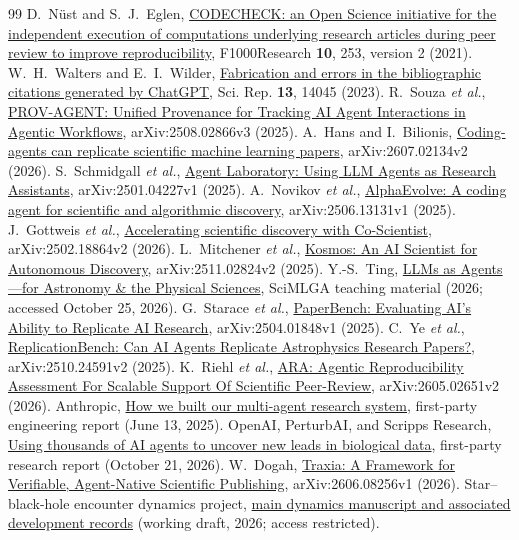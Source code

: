 \documentclass[aps,prd,reprint,nofootinbib]{revtex4-2}
\begin{document}
\begin{thebibliography}{99}
D.~N\"ust and S.~J.~Eglen,
\href{https://doi.org/10.12688/f1000research.51738.2}{CODECHECK: an Open Science initiative for the independent execution of computations underlying research articles during peer review to improve reproducibility}, F1000Research \textbf{10}, 253, version 2 (2021).
W.~H.~Walters and E.~I.~Wilder,
\href{https://doi.org/10.1038/s41598-023-41032-5}{Fabrication and errors in the bibliographic citations generated by ChatGPT}, Sci. Rep. \textbf{13}, 14045 (2023).
R.~Souza \emph{et al.},
\href{https://arxiv.org/abs/2508.02866v3}{PROV-AGENT: Unified Provenance for Tracking AI Agent Interactions in Agentic Workflows}, arXiv:2508.02866v3 (2025).
A.~Hans and I.~Bilionis,
\href{https://arxiv.org/abs/2607.02134v2}{Coding-agents can replicate scientific machine learning papers}, arXiv:2607.02134v2 (2026).
S.~Schmidgall \emph{et al.},
\href{https://arxiv.org/abs/2501.04227v1}{Agent Laboratory: Using LLM Agents as Research Assistants}, arXiv:2501.04227v1 (2025).
A.~Novikov \emph{et al.},
\href{https://arxiv.org/abs/2506.13131v1}{AlphaEvolve: A coding agent for scientific and algorithmic discovery}, arXiv:2506.13131v1 (2025).
J.~Gottweis \emph{et al.},
\href{https://arxiv.org/abs/2502.18864v2}{Accelerating scientific discovery with Co-Scientist}, arXiv:2502.18864v2 (2026).
L.~Mitchener \emph{et al.},
\href{https://arxiv.org/abs/2511.02824v2}{Kosmos: An AI Scientist for Autonomous Discovery}, arXiv:2511.02824v2 (2025).
Y.-S.~Ting, \href{https://tingyuansen.github.io/Agents_for_Astronomy/}{LLMs as Agents---for Astronomy \& the Physical Sciences}, SciMLGA teaching material (2026; accessed October 25, 2026).
G.~Starace \emph{et al.},
\href{https://arxiv.org/abs/2504.01848v1}{PaperBench: Evaluating AI's Ability to Replicate AI Research}, arXiv:2504.01848v1 (2025).
C.~Ye \emph{et al.},
\href{https://arxiv.org/abs/2510.24591v2}{ReplicationBench: Can AI Agents Replicate Astrophysics Research Papers?}, arXiv:2510.24591v2 (2025).
K.~Riehl \emph{et al.},
\href{https://arxiv.org/abs/2605.02651v2}{ARA: Agentic Reproducibility Assessment For Scalable Support Of Scientific Peer-Review}, arXiv:2605.02651v2 (2026).
Anthropic, \href{https://www.anthropic.com/research/multi-agent-research-system}{How we built our multi-agent research system}, first-party engineering report (June 13, 2025).
OpenAI, PerturbAI, and Scripps Research,
\href{https://openai.com/index/scaling-ai-research-for-complex-biological-data/}{Using thousands of AI agents to uncover new leads in biological data}, first-party research report (October 21, 2026).
W.~Dogah, \href{https://arxiv.org/abs/2606.08256v1}{Traxia: A Framework for Verifiable, Agent-Native Scientific Publishing}, arXiv:2606.08256v1 (2026).
Star--black-hole encounter dynamics project, \href{https://github.com/oshaughnessy-junior/starbh_paper_A-encounter-recipes}{main dynamics manuscript and associated development records} (working draft, 2026; access restricted).
\end{thebibliography}
\end{document}
